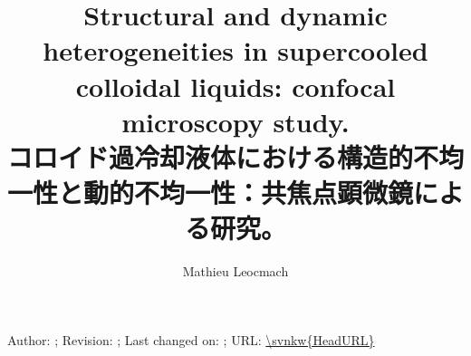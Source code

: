 \documentclass{hepthesis}
\title{Structural and dynamic heterogeneities in supercooled colloidal
liquids: confocal microscopy study.\\ \bigskip{} コロイド過冷却液体における構造的不均一性と動的不均一性：共焦点顕微鏡による研究。}
\author{Mathieu Leocmach}
\begin{document}

\begin{frontmatter}
	
	\begin{abstract}
		
	\end{abstract}
	\tableofcontents
	Author: \svnauthor; Revision: \svnrev; Last changed on: \svndate; URL: \url{\svnkw{HeadURL}}
\end{frontmatter}

\begin{mainmatter}
	
	
	
\end{mainmatter}

\begin{appendices}
%
\end{appendices}

\begin{backmatter}


\end{backmatter}
\end{document}
